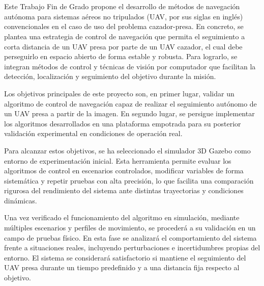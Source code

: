 \\

\vspace{0.7cm}
\begingroup\setlength{\parindent}{0pt}
\\

Este Trabajo Fin de Grado propone el desarrollo de métodos de navegación autónoma para sistemas aéreos no tripulados (UAV, por sus siglas en inglés) convencionales en el caso de uso del problema cazador-presa. En concreto, se plantea una estrategia de control de navegación que permita el seguimiento a corta distancia de un UAV presa por parte de un UAV cazador, el cual debe perseguirlo en espacio abierto de forma estable y robusta. Para lograrlo, se integran métodos de control y técnicas de visión por computador que facilitan la detección, localización y seguimiento del objetivo durante la misión. 

\vspace{0.3cm}

Los objetivos principales de este proyecto son, en primer lugar, validar un algoritmo de control de navegación capaz de realizar el seguimiento autónomo de un UAV presa a partir de la imagen. En segundo lugar, se persigue implementar los algoritmos desarrollados en una plataforma empotrada para su posterior validación experimental en condiciones de operación real.

\vspace{0.3cm}
Para alcanzar estos objetivos, se ha seleccionado el simulador 3D Gazebo como entorno de experimentación inicial. Esta herramienta permite evaluar los algoritmos de control en escenarios controlados, modificar variables de forma sistemática y repetir pruebas con alta precisión, lo que facilita una comparación rigurosa del rendimiento del sistema ante distintas trayectorias y condiciones dinámicas.

\vspace{0.3cm}
Una vez verificado el funcionamiento del algoritmo en simulación, mediante múltiples escenarios y perfiles de movimiento, se procederá a su validación en un campo de pruebas físico. En esta fase se analizará el comportamiento del sistema frente a situaciones reales, incluyendo perturbaciones e incertidumbres propias del entorno. El sistema se considerará satisfactorio si mantiene el seguimiento del UAV presa durante un tiempo predefinido y a una distancia fija respecto al objetivo.



